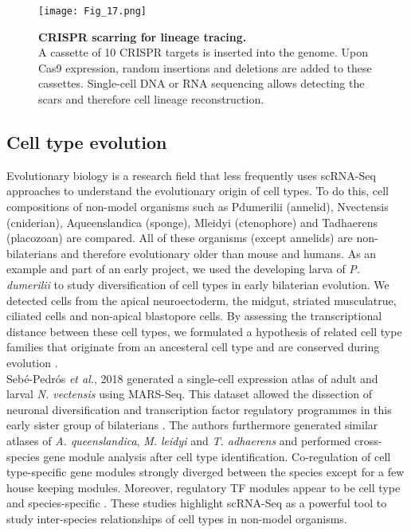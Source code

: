 \begin{figure}[!h]
\centering
\texttt{[image: Fig\_17.png]}
\caption[CRISPR/Cas9-scarring for lineage tracing]{\textbf{CRISPR scarring for lineage tracing.}\\
A cassette of 10 CRISPR targets is inserted into the genome. Upon Cas9 expression, random insertions and deletions are added to these cassettes. Single-cell DNA or RNA sequencing allows detecting the scars and therefore cell lineage reconstruction.}
\label{fig0:CRISPR}
\end{figure}

\subsection{Cell type evolution} 

Evolutionary biology is a research field that less frequently uses scRNA-Seq approaches to understand the evolutionary origin of cell types. To do this, cell compositions of non-model organisms such as \gls{Pdumerilii} (annelid), \gls{Nvectensis} (cniderian), \gls{Aqueenslandica} (sponge), \gls{Mleidyi} (ctenophore) and \gls{Tadhaerens} (placozoan) are compared. All of these organisms (except annelids) are non-bilaterians and therefore evolutionary older than mouse and humans. As an example and part of an early project, we used the developing larva of \textit{P. dumerilii} to study diversification of cell types in early bilaterian evolution. We detected cells from the apical neuroectoderm, the midgut, striated musculatrue, ciliated cells and non-apical blastopore cells. By assessing the transcriptional distance between these cell types, we formulated a hypothesis of related cell type families that originate from an ancesteral cell type and are conserved during evolution \citep{Achim2018}.  \\

Seb\'e{}-Pedr\'o{}s \emph{et al.}, 2018 generated a single-cell expression atlas of adult and larval \textit{N. vectensis} using MARS-Seq. This dataset allowed the dissection of neuronal diversification and transcription factor regulatory programmes in this early sister group of bilaterians \citep{Sebe-Pedros2018}. The authors furthermore generated similar atlases of \textit{A. queenslandica}, \textit{M. leidyi} and \textit{T. adhaerens} and performed cross-species gene module analysis after cell type identification. Co-regulation of cell type-specific gene modules strongly diverged between the species except for a few house keeping modules. Moreover, regulatory TF modules appear to be cell type and species-specific \citep{Sebe-Pedros2018a}. These studies highlight scRNA-Seq as a powerful tool to study inter-species relationships of cell types in non-model organisms. 

